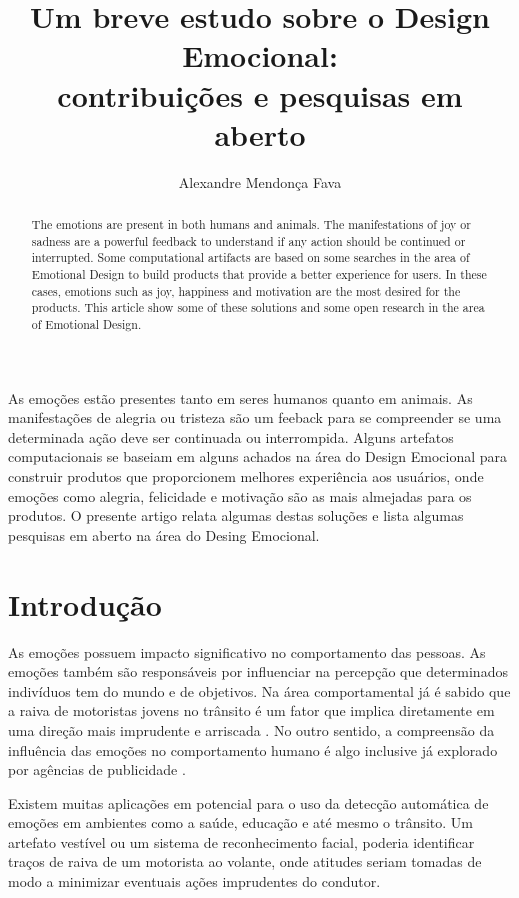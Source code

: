 \documentclass[12pt]{article}
\title{Um breve estudo sobre o Design Emocional: \\ contribuições e pesquisas em aberto}
\author{Alexandre Mendonça Fava\inst{1}}
\begin{document}
 

\maketitle

\begin{abstract}
The emotions are present in both humans and animals. The manifestations of joy or sadness are a powerful feedback to understand if any action should be continued or interrupted. Some computational artifacts are based on some searches in the area of Emotional Design to build products that provide a better experience for users. In these cases, emotions such as joy, happiness and motivation are the most desired for the products. This article show some of these solutions and some open research in the area of Emotional Design.
\end{abstract} 


\begin{resumo} 
As emoções estão presentes tanto em seres humanos quanto em animais. As manifestações de alegria ou tristeza são um feeback para se compreender se uma determinada ação deve ser continuada ou interrompida. Alguns artefatos computacionais se baseiam em alguns achados na área do Design Emocional para construir produtos que proporcionem melhores experiência aos usuários, onde emoções como alegria, felicidade e motivação são as mais almejadas para os produtos. O presente artigo relata algumas destas soluções e lista algumas pesquisas em aberto na área do Desing Emocional.
\end{resumo}


\section{Introdução}\label{secao:introducao}

As emoções possuem impacto significativo no comportamento das pessoas. As emoções também são responsáveis por influenciar na percepção que determinados indivíduos tem do mundo e de objetivos. Na área comportamental já é sabido que a raiva de motoristas jovens no trânsito é um fator que implica diretamente em uma direção mais imprudente e arriscada \cite{zhang2016association}. No outro sentido, a compreensão da influência das emoções no comportamento humano é algo inclusive já  explorado por agências de publicidade \cite{preece2015interaction}.

Existem muitas aplicações em potencial para o uso da detecção automática de emoções em ambientes como a saúde, educação e até mesmo o trânsito. Um artefato vestível ou um sistema de reconhecimento facial, poderia identificar traços de raiva de um motorista ao volante, onde atitudes seriam tomadas de modo a minimizar eventuais ações imprudentes do condutor. 
\end{document}
